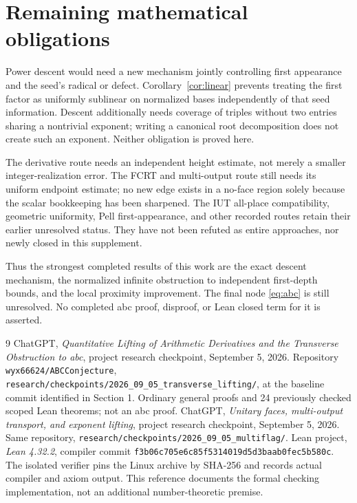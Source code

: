 \documentclass[11pt]{article}
\theoremstyle{definition}\newtheorem{definition}[theorem]{Definition}
\theoremstyle{remark}\newtheorem{remark}[theorem]{Remark}
\begin{document}
\section{Remaining mathematical obligations}
Power descent would need a new mechanism jointly controlling first
appearance and the seed's radical or defect. Corollary~\ref{cor:linear}
prevents treating the first factor as uniformly sublinear on normalized
bases independently of that seed information. Descent additionally needs
coverage of triples without two entries sharing a nontrivial exponent;
writing a canonical root decomposition does not create such an exponent.
Neither obligation is proved here.

The derivative route needs an independent height estimate, not merely a
smaller integer-realization error. The FCRT and multi-output route still
needs its uniform endpoint estimate; no new edge exists in a no-face region
solely because the scalar bookkeeping has been sharpened. The IUT
all-place compatibility, geometric uniformity, Pell first-appearance, and
other recorded routes retain their earlier unresolved status. They have
not been refuted as entire approaches, nor newly closed in this supplement.

Thus the strongest completed results of this work are the exact descent
mechanism, the normalized infinite obstruction to independent first-depth
bounds, and the local proximity improvement. The final node
\eqref{eq:abc} is still unresolved. No completed abc proof, disproof, or
Lean closed term for it is asserted.

\begin{thebibliography}{9}
ChatGPT, \emph{Quantitative Lifting of Arithmetic Derivatives and the
Transverse Obstruction to abc}, project research checkpoint, September 5,
2026. Repository \texttt{wyx66624/ABCConjecture},
\texttt{research/checkpoints/2026\_09\_05\_transverse\_lifting/}, at the
baseline commit identified in Section 1. Ordinary general proofs and
24 previously checked scoped Lean theorems; not an abc proof.
ChatGPT, \emph{Unitary faces, multi-output transport, and exponent lifting},
project research checkpoint, September 5, 2026. Same repository,
\texttt{research/checkpoints/2026\_09\_05\_multiflag/}.
Lean project, \emph{Lean 4.32.2}, compiler commit
\texttt{f3b06c705e6c85f5314019d5d3baab0fec5b580c}.
The isolated verifier pins the Linux archive by SHA-256 and records actual
compiler and axiom output. This reference documents the formal checking
implementation, not an additional number-theoretic premise.
\end{thebibliography}
\end{document}
